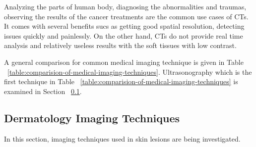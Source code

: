 \begin{itemize}
                    

                    Analyzing the parts of human body, diagnosing the abnormalities and traumas, observing the results of the cancer treatments are the common use cases of CTs.
                    It comes with several benefits sucs as getting good spatial resolution, detecting issues quickly and painlessly.
                    On the other hand, CTs do not provide real time analysis and relatively useless results with the soft tissues with low contrast.

                

        \end{itemize}

        A general comparison for common medical imaging technique is given in Table ~\ref{table:comparision-of-medical-imaging-techniques}.
        Ultrasonography which is the first technique in Table ~\ref{table:comparision-of-medical-imaging-techniques} is examined in Section ~\ref{subsection:dermatology-imaging-techniques}.

    \subsection{Dermatology Imaging Techniques} \label{subsection:dermatology-imaging-techniques}

        In this section, imaging techniques used in skin lesions are being investigated.

